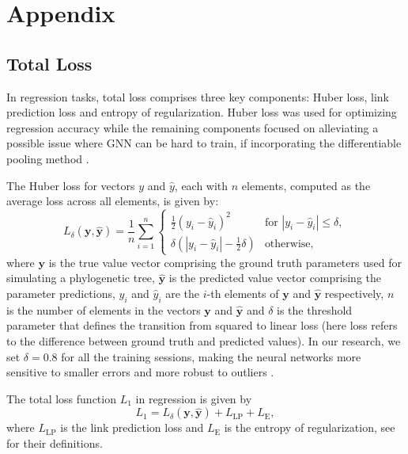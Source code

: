 {\section{Appendix}
\setcounter{subsection}{0}
\subsection{Total Loss}
\label{appendix::total_loss}
In regression tasks, total loss comprises three key components: Huber loss, link prediction loss and entropy of regularization. Huber loss was used for optimizing regression accuracy while the remaining components focused on alleviating a possible issue where GNN can be hard to train, if incorporating the differentiable pooling method \citep{ying_hierarchical_2018}.

The Huber loss \citep{huber_robust_1992} for vectors \(y\) and \(\hat{y}\), each with \(n\) elements, computed as the average loss across all elements, is given by:
\begin{equation}
    L_{\delta}(\mathbf{y}, \mathbf{\hat{y}}) = \frac{1}{n} \sum_{i=1}^{n} 
    \begin{cases} 
    \frac{1}{2}(y_i - \hat{y}_i)^2 & \text{for } |y_i - \hat{y}_i| \leq \delta, \\
    \delta(|y_i - \hat{y}_i| - \frac{1}{2}\delta) & \text{otherwise,}
    \end{cases}
    \label{ch3::equation::huber_loss}
\end{equation}
where \(\mathbf{y}\) is the true value vector comprising the ground truth parameters used for simulating a phylogenetic tree,
 \(\mathbf{\hat{y}}\) is the predicted value vector comprising the parameter predictions, \(y_i\) and \(\hat{y}_i\) are the \(i\)-th elements of \(\mathbf{y}\) and \(\mathbf{\hat{y}}\) respectively, \(n\) is the number of elements in the vectors \(\mathbf{y}\) and \(\mathbf{\hat{y}}\) and \(\delta\) is the threshold parameter that defines the transition from squared to linear loss (here loss refers to the difference between ground truth and predicted values). In our research, we set $\delta = 0.8$ for all the training sessions, making the neural networks more sensitive to smaller errors and more robust to outliers .

The total loss function $L_1$ in regression is given by
\begin{equation}
    \textit{$L_1$} =  L_{\delta}(\mathbf{y}, \mathbf{\hat{y}}) + \textit{L}_\text{LP} + \textit{L}_\text{E},
    \label{equation::total_loss_reg}
\end{equation}
where $\textit{L}_\text{LP}$ is the link prediction loss and $\textit{L}_\text{E}$ is the entropy of regularization, see \citet{ying_hierarchical_2018} for their definitions.

}
